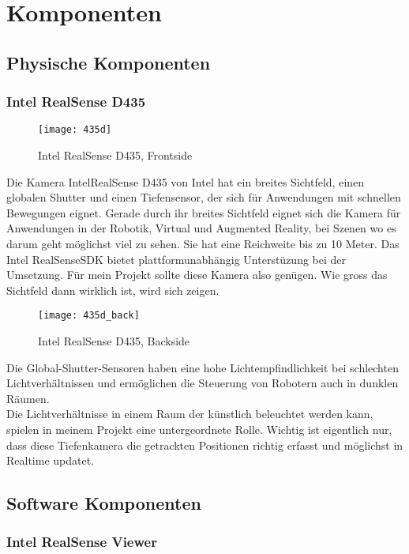 \section{Komponenten}

\subsection{Physische Komponenten}

\subsubsection{Intel RealSense D435}

\begin{figure}[H]
\texttt{[image: 435d]}
\caption{Intel RealSense D435, Frontside}
\label{fig:D435:1}
\end{figure}


Die Kamera IntelRealSense D435 von Intel hat ein breites Sichtfeld, einen globalen Shutter und einen Tiefensensor, der sich für Anwendungen mit schnellen Bewegungen eignet. Gerade durch ihr breites Sichtfeld eignet sich die Kamera für Anwendungen in der Robotik, Virtual und Augmented Reality, bei Szenen wo es darum geht möglichst viel zu sehen. Sie hat eine Reichweite bis zu 10 Meter. Das Intel RealSenseSDK bietet plattformunabhängig Unterstüzung bei der Umsetzung.
Für mein Projekt sollte diese Kamera also genügen. Wie gross das Sichtfeld dann wirklich ist, wird sich zeigen.
			
\begin{figure}[H]
\texttt{[image: 435d\_back]}
\caption{Intel RealSense D435, Backside}
\label{fig:D435:2}
\end{figure}
			
Die Global-Shutter-Sensoren haben eine hohe Lichtempfindlichkeit bei schlechten Lichtverhältnissen und ermöglichen die Steuerung von Robotern auch in dunklen Räumen.
\cite{Intel} \\
Die Lichtverhältnisse in einem Raum der künstlich beleuchtet werden kann, spielen in meinem Projekt eine untergeordnete Rolle. Wichtig ist eigentlich nur, dass diese Tiefenkamera die getrackten Positionen richtig erfasst und möglichst in Realtime updatet.

\subsection{Software Komponenten}

\subsubsection{Intel RealSense Viewer}

